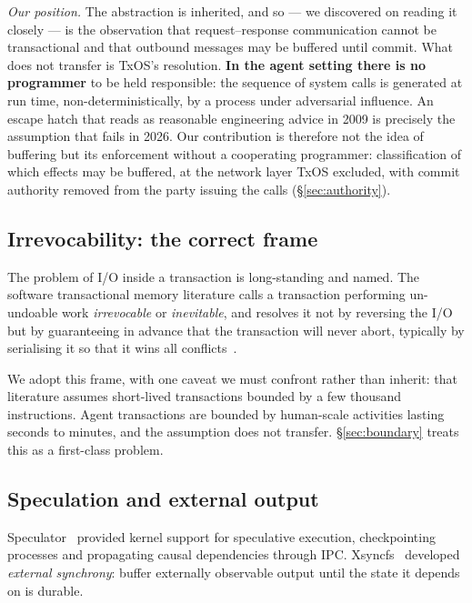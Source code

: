 \documentclass[10pt,twocolumn]{article}
\begin{document}
\emph{Our position.} The abstraction is inherited, and so --- we discovered on
reading it closely --- is the observation that request--response communication
cannot be transactional and that outbound messages may be buffered until commit.
What does not transfer is TxOS's resolution. \textbf{In the agent setting there
is no programmer} to be held responsible: the sequence of system calls is
generated at run time, non-deterministically, by a process under adversarial
influence. An escape hatch that reads as reasonable engineering advice in 2009
is precisely the assumption that fails in 2026. Our contribution is therefore
not the idea of buffering but its enforcement without a cooperating programmer:
classification of which effects may be buffered, at the network layer TxOS
excluded, with commit authority removed from the party issuing the calls
(\S\ref{sec:authority}).

\subsection{Irrevocability: the correct frame}

The problem of I/O inside a transaction is long-standing and named. The software
transactional memory literature calls a transaction performing un-undoable work
\emph{irrevocable} or \emph{inevitable}, and resolves it not by reversing the
I/O but by guaranteeing in advance that the transaction will never abort,
typically by serialising it so that it wins all
conflicts~\cite{welc2008irrevocable,spear2008inevitability}.

We adopt this frame, with one caveat we must confront rather than inherit: that
literature assumes short-lived transactions bounded by a few thousand
instructions. Agent transactions are bounded by human-scale activities lasting
seconds to minutes, and the assumption does not transfer.
\S\ref{sec:boundary} treats this as a first-class problem.

\subsection{Speculation and external output}

Speculator~\cite{nightingale2005speculator} provided kernel support for
speculative execution, checkpointing processes and propagating causal
dependencies through IPC. Xsyncfs~\cite{nightingale2006xsyncfs} developed
\emph{external synchrony}: buffer externally observable output until the state
it depends on is durable.
\end{document}
